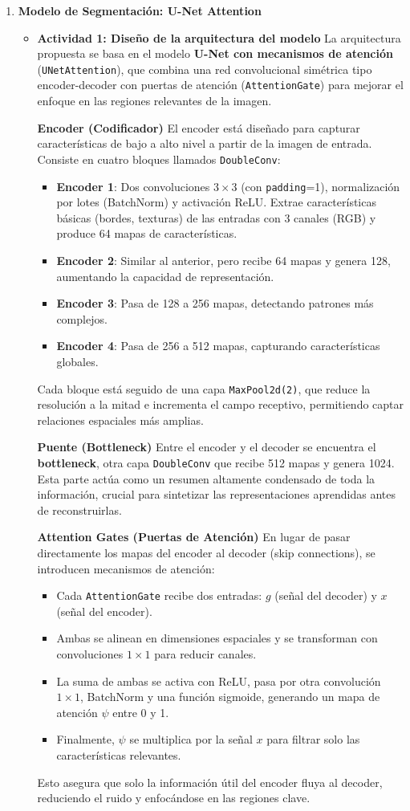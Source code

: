 \begin{enumerate}
  \item \textbf{Modelo de Segmentación: U-Net Attention}
  \begin{itemize}
  \item\textbf{Actividad 1: Diseño de la arquitectura del modelo}
  La arquitectura propuesta se basa en el modelo \textbf{U-Net con mecanismos de atención} (\texttt{UNetAttention}), que combina una red convolucional simétrica tipo encoder-decoder con puertas de atención (\texttt{AttentionGate}) para mejorar el enfoque en las regiones relevantes de la imagen.

\textbf{Encoder (Codificador)}
El encoder está diseñado para capturar características de bajo a alto nivel a partir de la imagen de entrada. Consiste en cuatro bloques llamados \texttt{DoubleConv}:
\begin{itemize}
    \item \textbf{Encoder 1}: Dos convoluciones $3\times3$ (con \texttt{padding}=1), normalización por lotes (BatchNorm) y activación ReLU. Extrae características básicas (bordes, texturas) de las entradas con 3 canales (RGB) y produce 64 mapas de características.
    \item \textbf{Encoder 2}: Similar al anterior, pero recibe 64 mapas y genera 128, aumentando la capacidad de representación.
    \item \textbf{Encoder 3}: Pasa de 128 a 256 mapas, detectando patrones más complejos.
    \item \textbf{Encoder 4}: Pasa de 256 a 512 mapas, capturando características globales.
\end{itemize}
Cada bloque está seguido de una capa \texttt{MaxPool2d(2)}, que reduce la resolución a la mitad e incrementa el campo receptivo, permitiendo captar relaciones espaciales más amplias.

\textbf{Puente (Bottleneck)}
Entre el encoder y el decoder se encuentra el \textbf{bottleneck}, otra capa \texttt{DoubleConv} que recibe 512 mapas y genera 1024. Esta parte actúa como un resumen altamente condensado de toda la información, crucial para sintetizar las representaciones aprendidas antes de reconstruirlas.

\textbf{Attention Gates (Puertas de Atención)}
En lugar de pasar directamente los mapas del encoder al decoder (skip connections), se introducen mecanismos de atención:
\begin{itemize}
    \item Cada \texttt{AttentionGate} recibe dos entradas: $g$ (señal del decoder) y $x$ (señal del encoder).
    \item Ambas se alinean en dimensiones espaciales y se transforman con convoluciones $1\times1$ para reducir canales.
    \item La suma de ambas se activa con ReLU, pasa por otra convolución $1\times1$, BatchNorm y una función sigmoide, generando un mapa de atención $\psi$ entre 0 y 1.
    \item Finalmente, $\psi$ se multiplica por la señal $x$ para filtrar solo las características relevantes.
\end{itemize}
Esto asegura que solo la información útil del encoder fluya al decoder, reduciendo el ruido y enfocándose en las regiones clave.


\end{itemize}
\end{enumerate}
